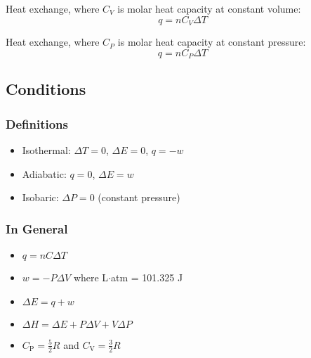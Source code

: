 \documentclass[10pt]{article}
\begin{document}
Heat exchange, where $C_V$ is molar heat capacity at constant volume:
\begin{equation*}
q= nC_V\Delta T
\end{equation*}

Heat exchange, where $C_P$ is molar heat capacity at constant pressure:
\begin{equation*}
q= nC_P\Delta T
\end{equation*}


\subsection{Conditions}

\subsubsection{Definitions}
\begin{itemize}
    \item Isothermal: $\Delta T = 0$, $\Delta E = 0$, $q = -w$
    \item Adiabatic: $q = 0$, $\Delta E = w$
    \item Isobaric: $\Delta P = 0$ (constant pressure)
\end{itemize}

\subsubsection{In General}
\begin{itemize}
    \item $q = nC\Delta T$
    \item $w = -P\Delta V$ where L$\cdot$atm = 101.325 J
    \item $\Delta E = q + w$
    \item $\Delta H = \Delta E + P\Delta V + V\Delta P$
    \item $C_\textrm{P} = \frac{5}{2}R$ and $C_\textrm{V} = \frac{3}{2}R$
\end{itemize}
\end{document}
